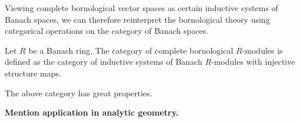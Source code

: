 Viewing complete bornological vector spaces as certain inductive systems of Banach spaces, we can therefore reinterpret the bornological theory using categorical operations on the category of Banach spaces. 

\begin{definition}
Let \(R\) be a Banach ring. The category of complete bornological \(R\)-modules is defined as the category of inductive systems of Banach \(R\)-modules with injective structure maps.
\end{definition}


\begin{theorem}
The above category has great properties.
\end{theorem}


\textbf{Mention application in analytic geometry.}